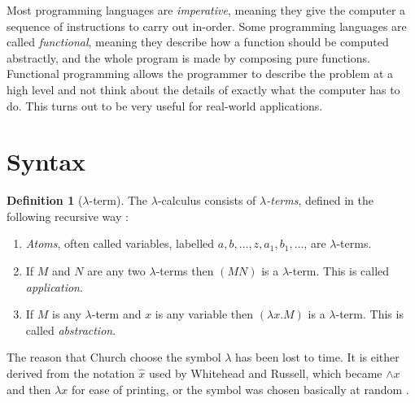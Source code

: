 \documentclass[a4paper, 11pt]{article}
\theoremstyle{plain}
\theoremstyle{definition}
\newtheorem{defn}{Definition}[section]
\theoremstyle{remark}
\begin{document}
Most programming languages are \textit{imperative}, meaning they give the computer a sequence of instructions to carry out in-order. Some programming languages are called \textit{functional}, meaning they describe how a function should be computed abstractly, and the whole program is made by composing pure functions. Functional programming allows the programmer to describe the problem at a high level and not think about the details of exactly what the computer has to do. This turns out to be very useful for real-world applications.



\section{Syntax}\label{sec:syntax}

\begin{defn}[$\lambda$-term]
The $\lambda$-calculus consists of \textit{$\lambda$-terms}, defined in the following recursive way \parencite[p.~3]{hindley-seldin-2008-lambda-calculus-and-combinators}:
\begin{enumerate}[(1)]
\item \textit{Atoms}, often called variables, labelled $a, b, \dotsc, z, a_1, b_1, \dotsc$, are $\lambda$-terms.
\item If $M$ and $N$ are any two $\lambda$-terms then $(MN)$ is a $\lambda$-term. This is called \textit{application}.
\item If $M$ is any $\lambda$-term and $x$ is any variable then $(\lambda x . M)$ is a $\lambda$-term. This is called \textit{abstraction}.
\end{enumerate}
\end{defn}

The reason that Church choose the symbol $\lambda$ has been lost to time. It is either derived from the notation $\hat x$ used by Whitehead and Russell, which became $\wedge x$ and then $\lambda x$ for ease of printing, or the symbol was chosen basically at random \parencite[p.~6]{cardone-hindley-2006-history-of-lambda-calculus}.
\end{document}
